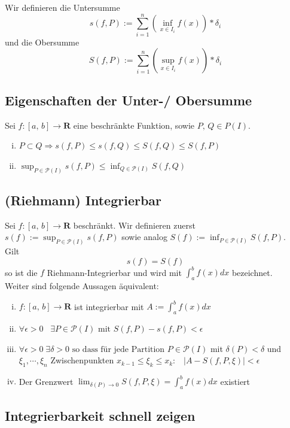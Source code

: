 \documentclass[8pt]{article}
\begin{document}
\begin{multicols*}{3}
Wir definieren die Untersumme
$$
  s(f, P) := \sum_{i = 1}^n (\inf_{x \in I_i} f(x)) * \delta_i
$$
und die Obersumme
$$
  S(f, P) := \sum_{i = 1}^n (\sup_{x \in I_i} f(x)) * \delta_i
$$

\subsection{Eigenschaften der Unter-/ Obersumme}

Sei $f: [a,\, b] \rightarrow \mathbf{R}$ eine beschränkte Funktion, sowie $P,\, Q \in P(I)$.
\begin{enumerate}[(i)]
  \item $P \subset Q \Rightarrow s(f, P) \leq s(f, Q) \leq S(f, Q) \leq S(f, P)$
  \item $\sup_{P \in \mathcal{P}(I)} s(f, P) \leq \inf_{Q \in \mathcal{P}(I)} S(f, Q)$
\end{enumerate}

\subsection{(Riehmann) Integrierbar}

Sei $f:[a,\,b] \rightarrow \mathbf{R}$ beschränkt. Wir definieren zuerst $s(f) := \sup_{P \in \mathcal{P}(I)} s(f, P)$ sowie analog $S(f) := \inf_{P \in \mathcal{P}(I)} S(f, P)$.\\
Gilt
$$
  s(f) = S(f)
$$
so ist die $f$ Riehmann-Integrierbar und wird mit $\int_a^b f(x)dx$ bezeichnet.\\
Weiter sind folgende Aussagen äquivalent:
\begin{enumerate}[(i)]
  \item $f:[a,\, b]\rightarrow \mathbf{R}$ ist integrierbar mit $A := \int_a^b f(x) dx$
  \item $\forall \epsilon > 0 \;\;\; \exists P \in \mathcal{P}(I) \text{ mit } S(f, P) - s(f, P) < \epsilon$
  \item $\forall \epsilon > 0 \; \exists \delta > 0 \text{ so dass für jede Partition } P \in \mathcal{P}(I) $ mit $ \delta(P) < \delta $ und $ \xi_1, \cdots, \xi_n $ Zwischenpunkten $x_{k-1} \leq \xi_k \leq x_k:\;\;\; |A - S(f, P, \xi)| < \epsilon$
  \item Der Grenzwert $\lim_{\delta(P) \rightarrow 0} S(f, P, \xi) = \int_a^b f(x)dx$ existiert
\end{enumerate}

\subsection{Integrierbarkeit schnell zeigen}


\end{multicols*}
\end{document}
